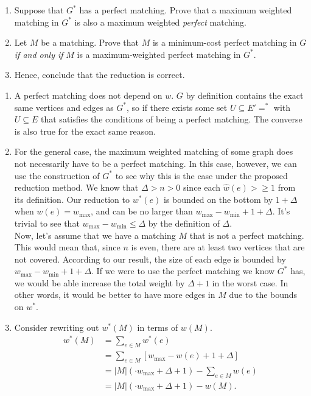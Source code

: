 \documentclass{article}
\begin{document}
\begin{question}
\begin{enumerate}[label = (\alph*)]
    \item Suppose that $G^*$ has a perfect matching. Prove that a maximum weighted matching in $G^*$ is also a maximum weighted {\em perfect} matching.

    \item Let $M$ be a matching. Prove that $M$ is a minimum-cost perfect matching in $G$ {\em if and only if} $M$ is a maximum-weighted perfect matching in $G^*$.

    \item Hence, conclude that the reduction is correct.
\end{enumerate}
\end{question}

\begin{solution}
\begin{enumerate}[label = (\alph*)]
    \item A perfect matching does not depend on $w$. $G$ by definition contains the exact same vertices and edges as $G^*$, so if there exists some set $U \subseteq E'=^*$ with $U \subseteq E$ that satisfies the conditions of being a perfect matching. The converse is also true for the exact same reason.
    
    \item For the general case, the maximum weighted matching of some graph does not necessarily have to be a perfect matching. In this case, however, we can use the construction of $G^*$ to see why this is the case under the proposed reduction method. We know that $\Delta > n > 0$ since each $\hat{w}(e) > \geq 1$ from its definition. Our reduction to $w^*(e)$ is bounded on the bottom by $1 + \Delta$ when $w(e) = w_\text{max}$, and can be no larger than $w_\text{max} - w_\text{min} + 1 + \Delta$. It's trivial to see that $w_\text{max} - w_\text{min} \leq \Delta$ by the definition of $\Delta$.\\

Now, let's assume that we have a matching $M$ that is not a perfect matching. This would mean that, since $n$ is even, there are at least two vertices that are not covered. According to our result, the size of each edge is bounded by $w_\text{max} - w_\text{min} + 1 + \Delta$. If we were to use the perfect matching we know $G^*$ has, we would be able increase the total weight by $\Delta + 1$ in the worst case. In other words, it would be better to have more edges in $M$ due to the bounds on $w^*$.
    
    \item Consider rewriting out $w^*(M)$ in terms of $w(M)$.
\begin{align*}
	w^*(M) &= \sum_{e \in M} w^*(e)\\
	&= \sum_{e \in M} \left[ w_\text{max} - w(e) + 1 + \Delta \right]\\
	&= |M|\left( \cdot w_\text{max} + \Delta + 1\right) - \sum_{e \in M} w(e)\\
	&= |M|\left( \cdot w_\text{max} + \Delta + 1\right) - w(M).
\end{align*}


\end{enumerate}
\end{solution}
\end{document}
